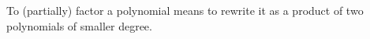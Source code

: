 \begin{frame}
\begin{definition}
To (partially) factor a polynomial means to rewrite it as a product of two polynomials of smaller degree.
\end{definition}
\end{frame}